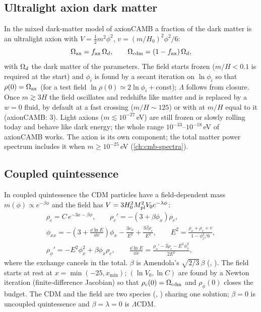 \subsection{Ultralight axion dark matter}

In the mixed dark-matter model of axionCAMB \cite{Hlozek2015} a fraction  of the dark matter is
an ultralight axion with $V=\frac12m^2\phi^2$, $v=(m/H_0)^2\phi^2/6$:
\begin{equation}
\Omega_{\rm ax}=f_{\rm ax}\,\Omega_d,\qquad \Omega_{\rm cdm}=(1-f_{\rm ax})\,\Omega_d,
\end{equation}
with $\Omega_d$ the dark matter of the parameters. The field starts frozen ($m/H<0.1$ is required at the start) and
$\phi_i$ is found by a secant iteration on $\ln\phi_i$ so that $\rho(0)=\Omega_{\rm ax}$ (for a test field
$\ln\rho(0)\simeq2\ln\phi_i+$const); $\Lambda$ follows from closure. Once $m\gtrsim3H$ the field oscillates and
redshifts like matter and is replaced by a $w=0$ fluid, by default at a fast crossing ($m/H\sim125$) or with
 at $m/H$ equal to it (axionCAMB: 3). Light axions ($m\lesssim10^{-27}$\,eV) are still frozen
or slowly rolling today and behave like dark energy; the whole range $10^{-33}$--$10^{-18}$\,eV of axionCAMB works.
The axion is its own component; the total matter power spectrum includes it when $m\ge10^{-25}$\,eV
(\cref{ch:cmb-spectra}).

\subsection{Coupled quintessence}\label{sec:bg-coupledquintessence}

In coupled quintessence \cite{Wetterich1995,Amendola2000} the CDM particles have a field-dependent mass
$m(\phi)\propto e^{-\beta\phi}$ and the field has $V=3H_0^2M_{\rm pl}^2V_0e^{-\lambda\phi}$:
\begin{gather}
\rho_c=C\,e^{-3x-\beta\phi},\qquad \rho_c'=-(3+\beta\phi_x)\rho_c,\\
\phi_{xx}=-\left(3+\frac{\dd\ln E}{\dd x}\right)\phi_x-\frac{3v_\phi}{E^2}+\frac{3\beta\rho_c}{E^2},\qquad
E^2=\frac{\rho_o+\rho_c+v}{1-\phi_x^2/6},\\
\rho_\phi'=-E^2\phi_x^2+\beta\phi_x\rho_c,\qquad \frac{\dd\ln E}{\dd x}=\frac{\rho_o'-3\rho_c-E^2\phi_x^2}{2E^2},
\end{gather}
where the exchange cancels in the total. $\beta$ is Amendola's $\sqrt{2/3}\,\beta$ (,
). The field starts at rest at $x=\min(-25,x_{\min})$; $(\ln V_0,\ln C)$ are found by a Newton
iteration (finite-difference Jacobian) so that $\rho_c(0)=\Omega_{\rm cdm}$ and $\rho_\phi(0)$ closes the budget. The
CDM and the field are two species (, ) sharing one solution;
$\beta=0$ is uncoupled quintessence and $\beta=\lambda=0$ is $\Lambda$CDM.


